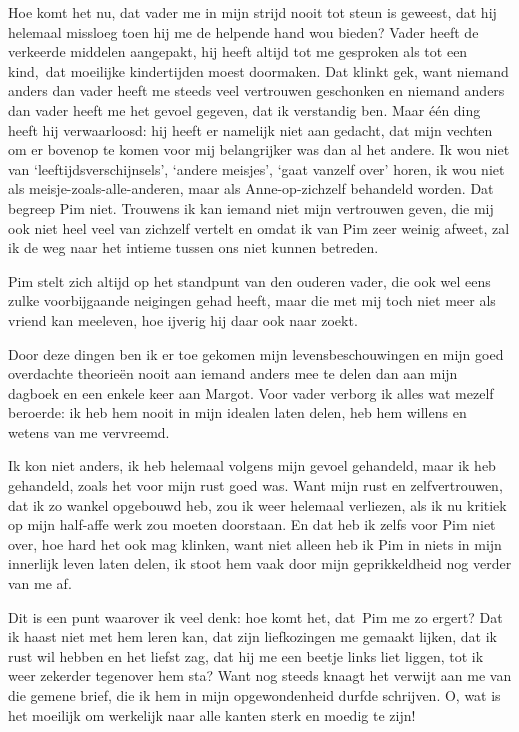 \documentclass{book}
\begin{document}
Hoe komt het nu, dat vader me in mijn strijd nooit tot steun is geweest, dat hij
helemaal missloeg toen hij me de helpende hand wou bieden? Vader heeft de
verkeerde middelen aangepakt, hij heeft altijd tot me gesproken als tot een
kind,~dat moeilijke kindertijden moest doormaken. Dat klinkt gek, want niemand
anders dan vader heeft me steeds veel vertrouwen geschonken en niemand anders
dan vader heeft me het gevoel gegeven, dat ik verstandig ben. Maar één ding
heeft hij verwaarloosd: hij heeft er namelijk niet aan gedacht, dat mijn vechten
om er bovenop te komen voor mij belangrijker was dan al het andere. Ik wou niet
van `leeftijdsverschijnsels', `andere meisjes', `gaat vanzelf over' horen, ik
wou niet als meisje-zoals-alle-anderen, maar als Anne-op-zichzelf behandeld
worden. Dat begreep Pim niet. Trouwens ik kan iemand niet mijn vertrouwen geven,
die mij ook niet heel veel van zichzelf vertelt en omdat ik van Pim zeer weinig
afweet, zal ik de weg naar het intieme tussen ons niet kunnen betreden.

Pim stelt zich altijd op het standpunt van den ouderen vader, die ook wel eens
zulke voorbijgaande neigingen gehad heeft, maar die met mij toch niet meer als
vriend kan meeleven, hoe ijverig hij daar ook naar zoekt.

Door deze dingen ben ik er toe gekomen mijn levensbeschouwingen en mijn goed
overdachte theorieën nooit aan iemand anders mee te delen dan aan mijn dagboek
en een enkele keer aan Margot. Voor vader verborg ik alles wat mezelf beroerde:
ik heb hem nooit in mijn idealen laten delen, heb hem willens en wetens van me
vervreemd.

Ik kon niet anders, ik heb helemaal volgens mijn gevoel gehandeld, maar ik heb
gehandeld, zoals het voor mijn rust goed was. Want mijn rust en zelfvertrouwen,
dat ik zo wankel opgebouwd heb, zou ik weer helemaal verliezen, als ik nu
kritiek op mijn half-affe werk zou moeten doorstaan. En dat heb ik zelfs voor
Pim niet over, hoe hard het ook mag klinken, want niet alleen heb ik Pim in
niets in mijn innerlijk leven laten delen, ik stoot hem vaak door mijn
geprikkeldheid nog verder van me af.

Dit is een punt waarover ik veel denk: hoe komt het, dat~Pim me zo ergert? Dat
ik haast niet met hem leren kan, dat zijn liefkozingen me gemaakt lijken, dat ik
rust wil hebben en het liefst zag, dat hij me een beetje links liet liggen, tot
ik weer zekerder tegenover hem sta? Want nog steeds knaagt het verwijt aan me
van die gemene brief, die ik hem in mijn opgewondenheid durfde schrijven. O, wat
is het moeilijk om werkelijk naar alle kanten sterk en moedig te zijn!
\end{document}
